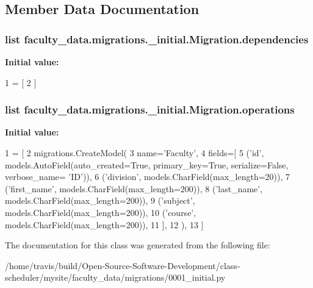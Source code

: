 \subsection{Member Data Documentation}
\hypertarget{classfaculty__data_1_1migrations_1_10001__initial_1_1_migration_a5b29328b7bc014cdf07fb3793fb187eb}{
\subsubsection[{dependencies}]{\setlength{\rightskip}{0pt plus 5cm}list faculty\-\_\-data.\-migrations.\-\_\-initial.\-Migration.\-dependencies\hspace{0.3cm}{\ttfamily [static]}}}\label{classfaculty__data_1_1migrations_1_10001__initial_1_1_migration_a5b29328b7bc014cdf07fb3793fb187eb}
{\bfseries Initial value\-:}
\begin{DoxyCode}
1 = [
2     ]
\end{DoxyCode}
\hypertarget{classfaculty__data_1_1migrations_1_10001__initial_1_1_migration_a3b462f7f278614cec6e12eaf6da24d81}{
\subsubsection[{operations}]{\setlength{\rightskip}{0pt plus 5cm}list faculty\-\_\-data.\-migrations.\-\_\-initial.\-Migration.\-operations\hspace{0.3cm}{\ttfamily [static]}}}\label{classfaculty__data_1_1migrations_1_10001__initial_1_1_migration_a3b462f7f278614cec6e12eaf6da24d81}
{\bfseries Initial value\-:}
\begin{DoxyCode}
1 = [
2         migrations.CreateModel(
3             name=\textcolor{stringliteral}{'Faculty'},
4             fields=[
5                 (\textcolor{stringliteral}{'id'}, models.AutoField(auto\_created=\textcolor{keyword}{True}, primary\_key=\textcolor{keyword}{True}, serialize=\textcolor{keyword}{False}, verbose\_name=\textcolor{stringliteral}{
      'ID'})),
6                 (\textcolor{stringliteral}{'division'}, models.CharField(max\_length=20)),
7                 (\textcolor{stringliteral}{'first\_name'}, models.CharField(max\_length=200)),
8                 (\textcolor{stringliteral}{'last\_name'}, models.CharField(max\_length=200)),
9                 (\textcolor{stringliteral}{'subject'}, models.CharField(max\_length=200)),
10                 (\textcolor{stringliteral}{'course'}, models.CharField(max\_length=200)),
11             ],
12         ),
13     ]
\end{DoxyCode}


The documentation for this class was generated from the following file\-:\begin{DoxyCompactItemize}
\item 
/home/travis/build/\-Open-\/\-Source-\/\-Software-\/\-Development/class-\/scheduler/mysite/faculty\-\_\-data/migrations/0001\-\_\-initial.\-py\end{DoxyCompactItemize}
